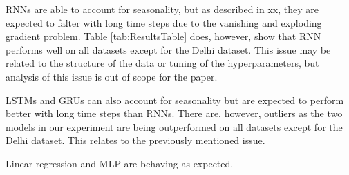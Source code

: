 RNNs are able to account for seasonality, but as described in xx, they are expected to falter with long time steps due to the vanishing and exploding gradient problem. Table \ref{tab:ResultsTable} does, however, show that RNN performs well on all datasets except for the Delhi dataset. This issue may be related to the structure of the data or tuning of the hyperparameters, but analysis of this issue is out of scope for the paper.
 
LSTMs and GRUs can also account for seasonality but are expected to perform better with long time steps than RNNs. There are, however, outliers as the two models in our experiment are being outperformed on all datasets except for the Delhi dataset. This relates to the previously mentioned issue.

Linear regression and MLP are behaving as expected.